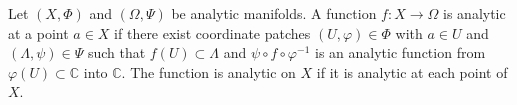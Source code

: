 Let $(X, \Phi)$ and $(\Omega, \Psi)$ be analytic manifolds. A function $f: X \to \Omega$ is analytic at a point $a \in X$ if there exist coordinate patches $(U, \varphi) \in \Phi$ with $a \in U$ and $(\Lambda, \psi) \in \Psi$ such that $f(U) \subset \Lambda$ and $\psi \circ f \circ \varphi^{-1}$ is an analytic function from $\varphi(U) \subset \mathbb{C}$ into $\mathbb{C}$. The function is analytic on $X$ if it is analytic at each point of $X$.
